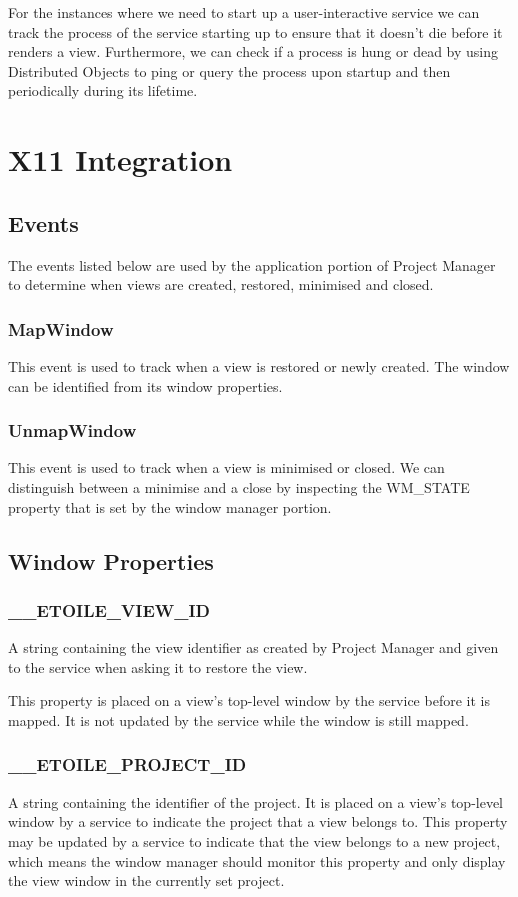 \documentclass[11pt]{report}
\newcommand{\proman}{Project Manager\xspace}
\begin{document}
For the instances where we need to start up a user-interactive service we can track the process of the service starting up to ensure that it doesn't die before it renders a view. Furthermore, we can check if a process is hung or dead by using Distributed Objects to ping or query the process upon startup and then periodically during its lifetime.
\section{X11 Integration}
\label{sec:x11_integration}
\subsection{Events}
The events listed below are used by the application portion of \proman to determine when views are created, restored, minimised and closed.
\subsubsection{MapWindow}
This event is used to track when a view is restored or newly created. The window can be identified from its window properties.
\subsubsection{UnmapWindow}
This event is used to track when a view is minimised or closed. We can distinguish between a minimise and a close by inspecting the WM\_STATE property that is set by the window manager portion.

\subsection{Window Properties}
\subsubsection{\_\_ETOILE\_VIEW\_ID}
A string containing the view identifier as created by \proman and given to the service when asking it to restore the view. 

This property is placed on a view's top-level window by the service before it is mapped. It is not updated by the service while the window is still mapped.

\subsubsection{\_\_ETOILE\_PROJECT\_ID}
A string containing the identifier of the project. It is placed on a view's top-level window by a service to indicate the project that a view belongs to. This property may be updated by a service to indicate that the view belongs to a new project, which means the window manager should monitor this property and only display the view window in the currently set project.
\end{document}
